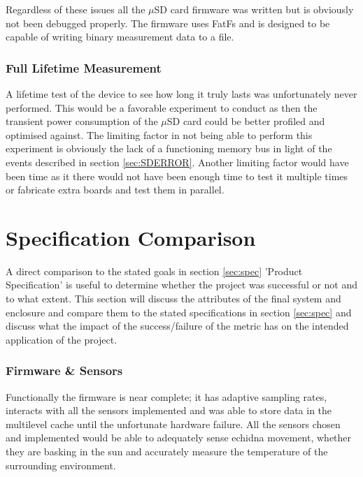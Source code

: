 \documentclass[12pt,openany,a4paper]{book}
\begin{document}
		Regardless of these issues all the $\mu$SD card firmware was written but is obviously not been debugged properly. The firmware uses FatFs and is designed to be capable of writing binary measurement data to a file. \\
		
	\subsubsection{Full Lifetime Measurement}
		A lifetime test of the device to see how long it truly lasts was unfortunately never performed. This would be a favorable experiment to conduct as then the transient power consumption of the $\mu$SD card could be better profiled and optimised against. The limiting factor in not being able to perform this experiment is obviously the lack of a functioning memory bus in light of the events described in section \ref{sec:SDERROR}. Another limiting factor would have been time as it there would not have been enough time to test it multiple times or fabricate extra boards and test them in parallel. \\
	
	\section{Specification Comparison}
	A direct comparison to the stated goals in section \ref{sec:spec} 'Product Specification' is useful to determine whether the project was successful or not and to what extent. This section will discuss the attributes of the final system and enclosure and compare them to the stated specifications in section \ref{sec:spec} and discuss what the impact of the success/failure of the metric has on the intended application of the project.\\
	
	\subsubsection{Firmware \& Sensors}
	Functionally the firmware is near complete; it has adaptive sampling rates, interacts with all the sensors implemented and was able to store data in the multilevel cache until the unfortunate hardware failure. All the sensors chosen and implemented would be able to adequately sense echidna movement, whether they are basking in the sun and accurately measure the temperature of the surrounding environment. \\
	
\end{document}
